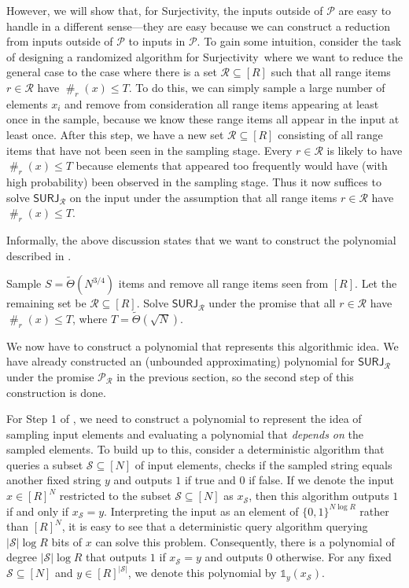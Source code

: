 \documentclass[11pt, letterpaper, fleqn]{article}
\theoremstyle{plain}
\renewcommand{\P}{\mathcal{P}}
\newcommand{\SURJ}{\mathsf{ SURJ}}
\newcommand{\Surjectivity}{Surjectivity}
\newcommand{\B}{\{0,1\}}
\newcommand{\tTheta}{\tilde{\Theta}}
\newcommand{\id}{{\mathds{1}}}
\newcommand{\Rcal}{\mathcal{R}}
\newcommand{\Scal}{\mathcal{S}}
\newcommand{\fr}{\operatorname{\#}}
\begin{document}
However, we will show that, for \Surjectivity, the inputs outside of $\P$ are easy to handle in a different sense---they are easy because we can construct a reduction from inputs outside of $\P$ to inputs in $\P$. 
To gain some intuition, consider the task of designing a randomized algorithm for \Surjectivity\ where we want to reduce the general case to the case where there is a set $\Rcal \subseteq [R]$ such that all range items $r\in \Rcal$ have $\fr_r(x)\leq T$.
To do this, we can simply sample a large number of elements $x_i$ and remove from consideration all  range items appearing at least once in the sample, because we know these range items all appear in the input at least once.
After this step, we have a new set $\Rcal\subseteq[R]$ consisting of all range items that have not been seen in the sampling stage.
Every $r\in\Rcal$ is likely to have $\fr_r(x)\leq T$ because elements that appeared too frequently would have (with high probability) been observed in the sampling stage.
Thus it now suffices to solve $\SURJ_{\Rcal}$ on the input under the assumption that all range items $r \in \Rcal$ have $\fr_r(x)\leq T$.

Informally, the above discussion states that we want to construct the polynomial described in .

\begin{algorithm}[H]
\caption{Informal description of the polynomial approximation for $\SURJ$}\label{alg:SURJalmost}
\begin{algorithmic}[1]
\vspace{0.25em}
\State Sample $S=\tTheta(N^{3/4})$ items and remove all range items seen from $[R]$. Let the remaining set be $\Rcal \subseteq [R]$.
\State Solve $\SURJ_{\Rcal}$ under the promise that all $r\in\Rcal$ have $\fr_r(x)\leq T$, where $T=\tTheta(\sqrt{N})$.
\end{algorithmic}
\end{algorithm}

We now have to construct a polynomial that represents this algorithmic idea. 
We have already constructed an (unbounded approximating) polynomial for $\SURJ_\Rcal$ under the promise $\P_\Rcal$ in the previous section, so the second step of this construction is done.

For Step 1 of , we need to construct a polynomial to represent the idea of sampling input elements and evaluating a polynomial that \emph{depends on} the sampled elements. 
To build up to this, consider a deterministic algorithm that queries a subset $\Scal \subseteq [N]$ of input elements, checks if the sampled string equals another fixed string $y$ and outputs $1$ if true and $0$ if false. If we denote the input $x\in[R]^N$ restricted to the subset $\Scal \subseteq [N]$ as $x_\Scal$, then this algorithm outputs $1$ if and only if $x_\Scal = y$. Interpreting the input as an element of $\B^{N \log R}$
rather than $[R]^N$, it is easy to see that a deterministic query algorithm querying $|\Scal|\log R$ bits of $x$ can solve this problem.
Consequently, there is a polynomial of degree $|\Scal|\log R$ that outputs $1$ if $x_\Scal = y$ and outputs $0$ otherwise.
For any fixed $\Scal \subseteq [N]$ and $y\in [R]^{|\Scal|}$, we denote this polynomial by $\id_y(x_\Scal)$.
\end{document}
